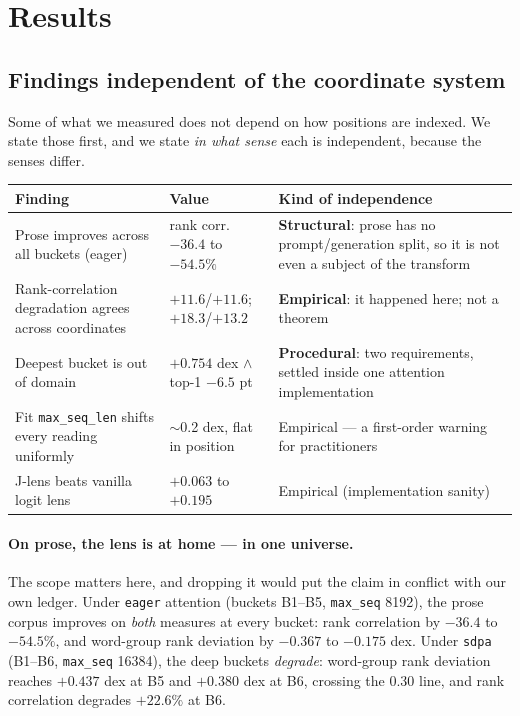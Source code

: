 \documentclass[11pt]{article}
\begin{document}
\section{Results}
\label{sec:results}

\subsection{Findings independent of the coordinate system}
\label{sec:pillars}

Some of what we measured does not depend on how positions are indexed. We
state those first, and we state \emph{in what sense} each is independent,
because the senses differ.

\begin{center}
\small
\begin{tabular}{@{}p{5.6cm}p{3.4cm}p{4.6cm}@{}}
\toprule
Finding & Value & Kind of independence \\
\midrule
Prose improves across all buckets (eager) & rank corr.\ $-36.4$ to $-54.5\%$ & \textbf{Structural}: prose has no prompt/generation split, so it is not even a subject of the transform \\
Rank-correlation degradation agrees across coordinates & $+11.6$/$+11.6$; $+18.3$/$+13.2$ & \textbf{Empirical}: it happened here; not a theorem \\
Deepest bucket is out of domain & $+0.754$ dex $\wedge$ top-1 $-6.5$ pt & \textbf{Procedural}: two requirements, settled inside one attention implementation \\
Fit \texttt{max\_seq\_len} shifts every reading uniformly & $\sim$0.2 dex, flat in position & Empirical --- a first-order warning for practitioners \\
J-lens beats vanilla logit lens & $+0.063$ to $+0.195$ & Empirical (implementation sanity) \\
\bottomrule
\end{tabular}
\end{center}

\paragraph{On prose, the lens is at home --- in one universe.}
The scope matters here, and dropping it would put the claim in conflict
with our own ledger. Under \texttt{eager} attention (buckets B1--B5,
\texttt{max\_seq} 8192), the prose corpus improves on \emph{both}
measures at every bucket: rank correlation by $-36.4$ to $-54.5\%$, and
word-group rank deviation by $-0.367$ to $-0.175$ dex. Under
\texttt{sdpa} (B1--B6, \texttt{max\_seq} 16384), the deep buckets
\emph{degrade}: word-group rank deviation reaches $+0.437$ dex at B5 and
$+0.380$ dex at B6, crossing the 0.30 line, and rank correlation degrades
$+22.6\%$ at B6.
\end{document}
